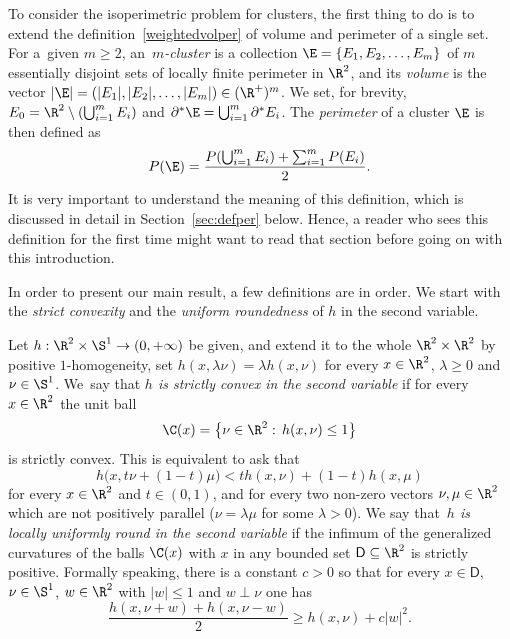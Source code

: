To consider the isoperimetric problem for clusters, the first thing to do is to extend the definition~\eqref{weightedvolper} of volume and perimeter of a single set. For a~given $m\geq 2$, an~\emph{$m$\nobreakdash-cluster} is a collection $\E=\{E_1,E_2,\dots, E_m\}$ of $m$ essentially disjoint sets of local\-ly finite perimeter in $\R^2$, and its \emph{volume} is the vector $|\E|=(|E_1|, |E_2|,\dots, |E_m|)\in (\R^+)^m$. We set, for brevity, $E_0=\R^2\setminus (\bigcup_{i=1}^m E_i)$ and $\partial^* \E=\bigcup_{i=1}^m \partial^* E_i$. The \emph{perimeter} of a cluster $\E$ is then defined as
\begin{equation}\label{PbE}
P(\E) = \frac{P(\bigcup_{i=1}^m E_i) + \sum_{i=1}^m P(E_i) }2 .
\end{equation}
It is very important to understand the meaning of this definition, which is discussed in detail in Section~\ref{sec:defper} below. Hence, a reader who sees this definition for the first time might want to read that section before going on with this introduction.

In order to present our main result, a few definitions are in order. We start with the \emph{strict convexity} and the \emph{uniform roundedness} of $h$ in the second variable.
\begin{defn}\label{strictconv}
Let $h:\R^2\times\S^1\to (0,+\infty)$ be given, and extend it to the whole $\R^2\times\R^2$ by positive $1$-homogeneity, \ie set $h(x,\lambda\nu)=\lambda h(x,\nu)$ for every $x\in\R^2$, $\lambda\geq 0$ and $\nu\in\S^1$. We~say that \emph{$h$ is strictly convex in the second variable} if for every $x\in\R^2$ the unit ball
\begin{equation}\label{unitball}
\C(x) = \big\{ \nu\in\R^2:\, h(x,\nu)\leq 1\big\}
\end{equation}
is strictly convex. This is equivalent to ask that
\[
h\big(x,t\nu+(1-t)\mu\big) < th(x,\nu) + (1-t) h(x,\mu)
\]
for every $x\in\R^2$ and $t\in(0,1)$, and for every two non-zero vectors $\nu,\mu\in\R^2$ which are not positively parallel (\ie $\nu=\lambda\mu$ for some $\lambda>0$). We say that~\emph{$h$ is locally uniformly round in the second variable} if the infimum of the generalized curvatures of the balls $\C(x)$ with $x$ in any bounded set $\mathsf{D}\subseteq\R^2$ is strictly positive. Formally speaking, there is a constant $c>0$ so that for every $x\in \mathsf{D}$, $\nu\in \S^1$, $w\in\R^2$ with $|w|\leq 1$ and $w\perp \nu$ one has\vspace*{-3pt}\enlargethispage{.5\baselineskip}%
\begin{equation}\label{numero}
\frac{h(x,\nu+w) + h(x,\nu-w)}2 \geq h(x,\nu) + c |w|^2.
\end{equation}
\end{defn}

